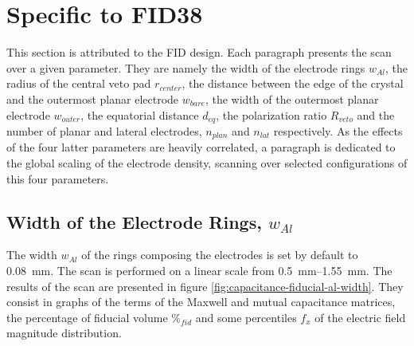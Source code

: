 

\section{Specific to FID38}

This section is attributed to the FID design. Each paragraph presents the scan over a given parameter. They are namely the width of the electrode rings $w_{Al}$, the radius of the central veto pad $r_{center}$, the distance between the edge of the crystal and the outermost planar electrode $w_{bare}$, the width of the outermost planar electrode $w_{outer}$, the equatorial distance $d_{eq}$, the polarization ratio $R_{veto}$ and the number of planar and lateral electrodes, $n_{plan}$ and $n_{lat}$ respectively. As the effects of the four latter parameters are heavily correlated, a paragraph is dedicated to the global scaling of the electrode density, scanning over selected configurations of this four parameters.


\subsection{Width of the Electrode Rings, $w_{Al}$}

The width $w_{Al}$ of the rings composing the electrodes is set by default to \SI{0.08}{\mm}. The scan is performed on a linear scale from \SIrange{0.5}{1.55}{\mm}. The results of the scan are presented in figure \ref{fig:capacitance-fiducial-al-width}. They consist in graphs of the terms of the Maxwell and mutual capacitance matrices, the percentage of fiducial volume $\%_{fid}$ and some percentiles $f_x$ of the electric field magnitude distribution.

